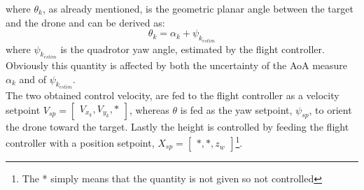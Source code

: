 where $\theta_k$, as already mentioned, is the geometric planar angle between the target and the drone and can be derived as:
\begin{equation}\label{PF:yawsp}
    \theta_k = \alpha_k +\psi_{k_{estim}}
\end{equation}
where $\psi_{k_{estim}}$ is the quadrotor yaw angle, estimated by the flight controller. Obviously this quantity is affected by both the uncertainty of the AoA measure $\alpha_k$ and of $\psi_{k_{estim}}$.\\
The two obtained control velocity, are fed to the flight controller as a velocity setpoint $V_{sp} = \begin{bmatrix} V_{x_k}, V_{y_k}, *\end{bmatrix}$, whereas $\theta$ is fed as the yaw setpoint, $\psi_{sp}$, to orient the drone toward the target. Lastly the height is controlled by feeding the flight controller with a position setpoint, $X_{sp} = \begin{bmatrix} *, *, z_w\end{bmatrix}$\footnote{The * simply means that the quantity is not given so not controlled}.
 





